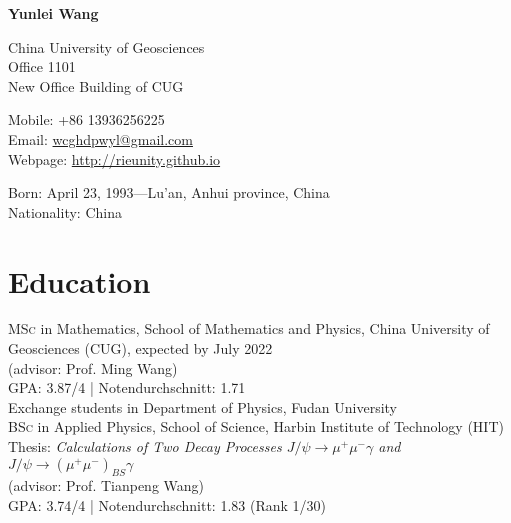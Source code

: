 \documentclass[11pt]{article} %
\begin{document}

{\LARGE\bfseries Yunlei Wang} %
\bigskip\bigskip\medskip %

China University of Geosciences\\ %
Office 1101\\ New Office Building of CUG

\vspace{0.01\textheight} 

Mobile: +86 13936256225\\ %
Email: \href{wcghdpwyl@gmail.com}{wcghdpwyl@gmail.com}\\ %
Webpage: \href{http://rieunity.github.io}{http://rieunity.github.io}%

\vspace{0.01\textheight} %


Born: April 23, 1993---Lu'an, Anhui province, China\\ %
Nationality: China %


\section*{Education}

\textsc{MSc} in Mathematics, School of Mathematics and Physics, China University of Geosciences (CUG), expected by July 2022\\
(advisor: Prof. Ming Wang)\\
GPA: 3.87/4 | Notendurchschnitt: 1.71 \\
 Exchange students in Department of Physics,  Fudan University\\
\textsc{BSc} in Applied Physics, School of Science, Harbin Institute of Technology (HIT)\\
Thesis: \emph{Calculations of Two Decay Processes $J /\psi \to \mu^+\mu^-\gamma$ and $J /\psi \to (\mu^+\mu^-)_{BS}\gamma$} \\
(advisor: Prof. Tianpeng Wang) \\
GPA: 3.74/4 | Notendurchschnitt: 1.83 (Rank 1/30)
\end{document}
